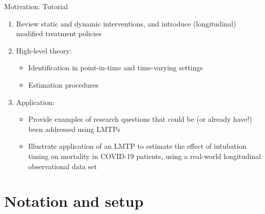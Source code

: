 \documentclass[
  10pt,
  ignorenonframetext,
]{beamer}
\providecommand{\tightlist}{%
  \setlength{\itemsep}{0pt}\setlength{\parskip}{0pt}}\usepackage{longtable,booktabs,array}
\begin{document}
\begin{frame}{Motivation: Tutorial}
\protect\hypertarget{motivation-tutorial}{}
\begin{enumerate}
\item
  Review static and dynamic interventions, and introduce (longitudinal)
  modified treatment policies
\item
  High-level theory:

  \begin{itemize}
  \tightlist
  \item
    Identification in point-in-time and time-varying settings
  \item
    Estimation procedures
  \end{itemize}
\item
  Application:

  \begin{itemize}
  \tightlist
  \item
    Provide examples of research questions that could be (or already
    have!) been addressed using LMTPs
  \item
    Illustrate application of an LMTP to estimate the effect of
    intubation timing on mortality in COVID-19 patients, using a
    real-world longitudinal observational data set
  \end{itemize}
\end{enumerate}
\end{frame}

\hypertarget{notation-and-setup}{%
\section{Notation and setup}\label{notation-and-setup}}
\end{document}
